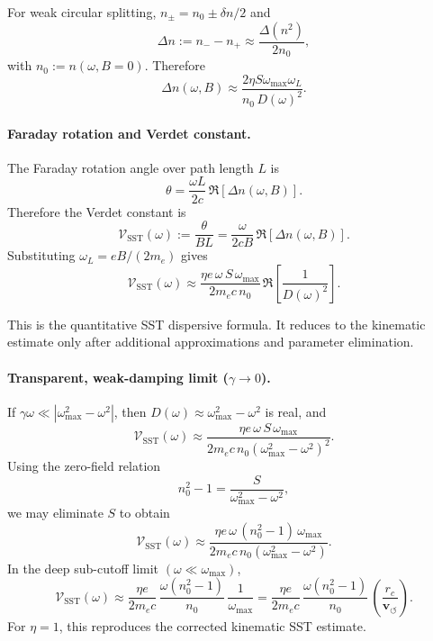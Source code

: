 \documentclass[10pt]{article}
\begin{document}
            For weak circular splitting, \(n_\pm=n_0\pm \delta n/2\) and
            \[
                \Delta n:=n_- - n_+ \approx \frac{\Delta(n^2)}{2n_0},
            \]
            with \(n_0:=n(\omega,B=0)\). Therefore
            \[
                \boxed{
                    \Delta n(\omega,B)
                    \approx
                    \frac{2\eta S\omega_{\max}\omega_L}{n_0\,D(\omega)^2}
                }.
            \]
        
        \paragraph{Faraday rotation and Verdet constant.}
            The Faraday rotation angle over path length \(L\) is
            \[
                \theta=\frac{\omega L}{2c}\,\Re\!\left[\Delta n(\omega,B)\right].
            \]
            Therefore the Verdet constant is
            \[
                \mathcal{V}_{\mathrm{SST}}(\omega)
                :=\frac{\theta}{BL}
                =
                \frac{\omega}{2cB}\,\Re\!\left[\Delta n(\omega,B)\right].
            \]
            Substituting \(\omega_L=eB/(2m_e)\) gives
            \[
                \boxed{
                    \mathcal{V}_{\mathrm{SST}}(\omega)
                    \approx
                    \frac{\eta e\,\omega\,S\,\omega_{\max}}{2m_e c\,n_0}\,
                    \Re\!\left[\frac{1}{D(\omega)^2}\right]
                }.
            \]
            
            This is the quantitative SST dispersive formula. It reduces to the kinematic estimate only after additional approximations and parameter elimination.
        
        \paragraph{Transparent, weak-damping limit (\(\gamma\to 0\)).}
            If \(\gamma\omega\ll |\omega_{\max}^2-\omega^2|\), then \(D(\omega)\approx \omega_{\max}^2-\omega^2\) is real, and
            \[
                \mathcal{V}_{\mathrm{SST}}(\omega)
                \approx
                \frac{\eta e\,\omega\,S\,\omega_{\max}}{2m_e c\,n_0(\omega_{\max}^2-\omega^2)^2}.
            \]
            Using the zero-field relation
            \[
                n_0^2-1=\frac{S}{\omega_{\max}^2-\omega^2},
            \]
            we may eliminate \(S\) to obtain
            \[
                \boxed{
                    \mathcal{V}_{\mathrm{SST}}(\omega)
                    \approx
                    \frac{\eta e\,\omega\,(n_0^2-1)\,\omega_{\max}}
                    {2m_e c\,n_0(\omega_{\max}^2-\omega^2)}
                }.
            \]
            In the deep sub-cutoff limit \((\omega\ll \omega_{\max})\),
            \[
                \mathcal{V}_{\mathrm{SST}}(\omega)
                \approx
                \frac{\eta e}{2m_e c}\,
                \frac{\omega (n_0^2-1)}{n_0}\,
                \frac{1}{\omega_{\max}}
                =
                \frac{\eta e}{2m_e c}\,
                \frac{\omega (n_0^2-1)}{n_0}\,
                \left(\frac{r_c}{\mathbf{v}_{\!\boldsymbol{\circlearrowleft}}}\right).
            \]
            For \(\eta=1\), this reproduces the corrected kinematic SST estimate.
\end{document}
